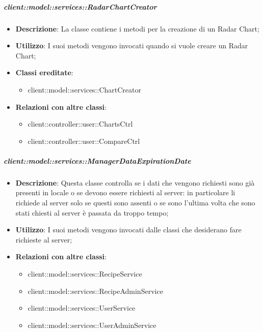 		\subparagraph{client::model::services::RadarChartCreator} %
		\label{subp:radarchartcreator}
			\begin{itemize}
				\item \textbf{Descrizione}: La classe contiene i metodi per la creazione di un Radar Chart;
				\item \textbf{Utilizzo}: I suoi metodi vengono invocati quando si vuole creare un Radar Chart;
				\item \textbf{Classi ereditate}:
					\begin{itemize}
						\item client::model::services::ChartCreator
					\end{itemize}
				\item \textbf{Relazioni con altre classi}:
					\begin{itemize}
						\item client::controller::user::ChartsCtrl
						\item client::controller::user::CompareCtrl
					\end{itemize}
			\end{itemize}

		\subparagraph{client::model::services::ManagerDataExpirationDate} %
		\label{subp:radarchartcreator}
			\begin{itemize}
				\item \textbf{Descrizione}: Questa classe controlla se i dati che vengono richiesti sono già presenti in locale o se devono essere richiesti al server: in particolare li richiede al server solo se questi sono assenti o se sono l'ultima volta che sono stati chiesti al server è passata da troppo tempo;
				\item \textbf{Utilizzo}: I suoi metodi vengono invocati dalle classi che desiderano fare richieste al server;
				\item \textbf{Relazioni con altre classi}:
					\begin{itemize}
						\item client::model::services::RecipeService
						\item client::model::services::RecipeAdminService
						\item client::model::services::UserService
						\item client::model::services::UserAdminService
					\end{itemize}
			\end{itemize}

